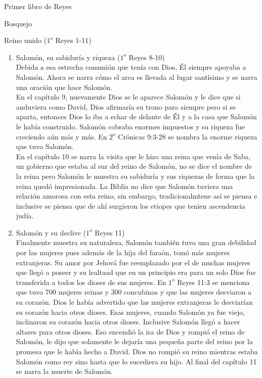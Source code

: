 \begin{section}{Primer libro de Reyes}
\begin{subsection}{Bosquejo}
\begin{subsubsection}{Reino unido ($1^{o}$ Reyes 1-11)}
\begin{enumerate}
	En el capítulo 7 se narra a detalle otras grandes obras que hizo Salomón con la riqueza y los esclavos que tenía. Una de ellas fue su propoia casa, la casa del bosque del líbano y la casa para la hija del faraón donde todas ellas fueron monumentales.
\item Salomón, su sabiduría y riqueza ($1^{o}$ Reyes 8-10)\\
	Debida a esa estrecha comunión que tenía con Dios, Él siempre apoyaba a Salomón.
	\newpage
	Ahora se narra cómo el arca es llevada al lugar santísimo y se narra una oración que hace Salomón.\\
	En el capítulo 9, nuevamente Dios se le aparece Salomón y le dice que si anduviera como David, Dios afirmaría su trono para siempre pero si se aparta, entonces Dios lo iba a echar de delante de Él y a la casa que Salomón le había construido. Salomón cobraba enormes impuestos y su riqueza fue creciendo aún más y más. En $2^{o}$ Crónicas 9:3-28 se nombra la enorme riqueza que tuvo Salomón.\\
	 En el capítulo 10 se narra la visita que le hizo una reina que venía de Saba, un gobierno que estaba al sur del reino de Salomón, no se dice el nombre de la reina pero Salomón le muestra su sabiduría y sus riquezas de forma que la reina quedó impresionada. La Biblia no dice que Salomón tuviera una relación amorosa con esta reino, sin embargo, tradicionalmtene así se piensa e inclusive se piensa que de ahí surgieron los etiopes que tenien ascendencia judía.
 \item Salomón y su declive ($1^{o}$ Reyes 11)\\
	 Finalmente muestra su naturaleza, Salomón también tuvo una gran debilidad por las mujeres pues además de la hija del faraón, tomó más mujeres extranjeras. Su amor por Jehová fue reemplazado por el de muchas mujeres que llegó a poseer y su lealtaad que en un principio era para un solo Dios fue transferida a todos los dioses de sus mujeres. En $1^{o}$ Reyes 11:3 se menciona que tuvo 700 mujeres reinas y 300 concubinas y que las mujeres desviaron a su corazón. Dios le había advertido que las mujeres extranjeras le desviarían su corazón hacia otros dioses. Esas mujeres, cuando Salomón ya fue viejo, inclinaron su corazón hacia otros dioses. Inclusive Salomón llegó a hacer altares para otros dioses. Eso encendió la ira de Dios y rompió el reino de Salomón, le dijo que solamente le dejaría una pequeña parte del reino por la promesa que le había hecho a David. Dios no rompió su reino mientras estaba Salomón como rey sino hasta que lo sucediera su hijo. Al final del capítulo 11 se narra la muerte de Salomón.\\

\end{enumerate}
\end{subsubsection}
\end{subsection}
\end{section}
